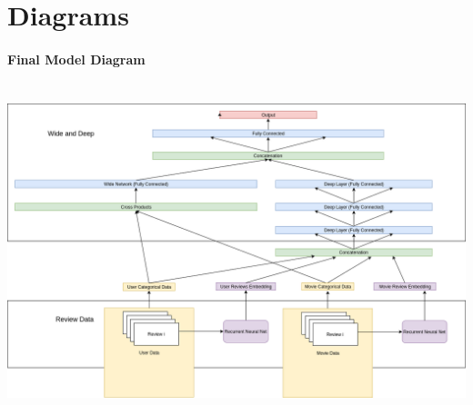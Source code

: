 \documentclass[preprint,10.5pt]{article}
\begin{document}
\section{Diagrams}
\paragraph{Final Model Diagram} \ \newline
\includegraphics[scale=0.38]{network_diagram}
\end{document}
